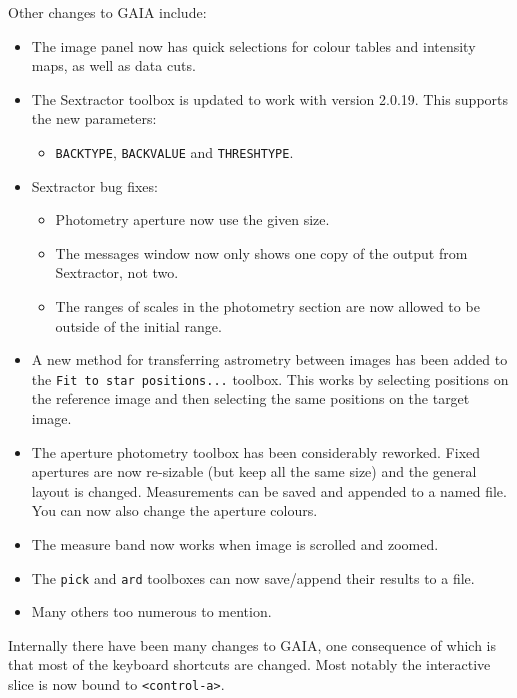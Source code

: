 \documentclass[twoside,11pt]{article}
\renewcommand{\_}{\texttt{\symbol{95}}}
\newcommand{\mytt}[1]{{\texttt{#1}}}
\begin{document}
  Other changes to GAIA include:
  \begin{itemize}
    \item The image panel now has quick selections for colour tables and
      intensity maps, as well as data cuts.

    \item The Sextractor toolbox is updated to work with version 2.0.19.
      This supports the new parameters:
        \begin{itemize}
           \item \mytt{BACK\_TYPE}, \mytt{BACK\_VALUE} and \mytt{THRESH\_TYPE}.
        \end{itemize}

    \item Sextractor bug fixes:
        \begin{itemize}
          \item Photometry aperture now use the given size.
          \item The messages window now only shows one copy of
                the output from Sextractor, not two.
          \item The ranges of scales in the photometry section are
                now allowed to be outside of the initial range.
        \end{itemize}

    \item A new method for transferring astrometry between images has been
      added to the \mytt{Fit to star positions...} toolbox. This works by
      selecting positions on the reference image and then selecting the
      same positions on the target image.

    \item The aperture photometry toolbox has been considerably
      reworked. Fixed apertures are now re-sizable (but keep all the
      same size) and the general layout is changed. Measurements can
      be saved and appended to a named file. You can now also change
      the aperture colours.

    \item The measure band now works when image is scrolled and zoomed.

    \item  The \mytt{pick} and \mytt{ard} toolboxes can now
           save/append their results to a file.

    \item Many others too numerous to mention.
\end{itemize}
Internally there have been many changes to GAIA, one consequence of
which is that most of the keyboard shortcuts are changed. Most
notably the interactive slice is now bound to \mytt{<control-a>}.
\end{document}
